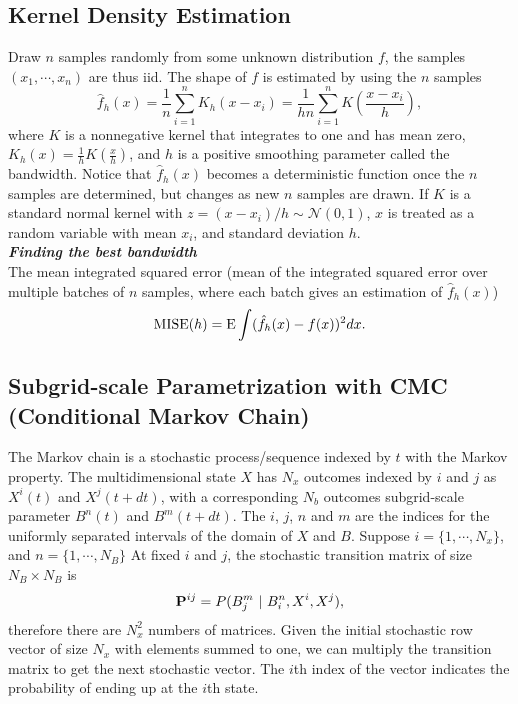\documentclass[12pt]{article}
\newcommand{\Exp}{{\bf\text{E}}}
\begin{document}
\subsection{Kernel Density Estimation}
Draw $n$ samples randomly from some unknown distribution $f$, the samples $(x_1,\cdots,x_n)$ are thus iid. 
The shape of $f$ is estimated by using the $n$ samples
\begin{equation}
   \hat{f}_h(x) = \frac{1}{n} \sum_{i=1}^n K_h(x-x_i) = \frac{1}{hn} \sum_{i=1}^n K(\frac{x-x_i}{h}),
\end{equation}
where $K$ is a nonnegative kernel that integrates to one and has mean zero, $K_h(x) = \frac{1}{h}K(\frac{x}{h})$, and $h$ is a positive smoothing parameter called the bandwidth.
Notice that $\hat{f}_h(x)$ becomes a deterministic function once the $n$ samples are determined, but changes as new $n$ samples are drawn.
If $K$ is a standard normal kernel with $z = (x-x_i)/h \sim \mathcal{N}(0,1)$, $x$ is treated as a random variable with mean $x_i$, and standard deviation $h$. \\


{\bf\emph{Finding the best bandwidth}} \\
The mean integrated squared error (mean of the integrated squared error over multiple batches of $n$ samples, where each batch gives an estimation of $\hat{f}_h(x)$)
\begin{equation}
   \text{MISE}(h) = \Exp\int(\hat{f}_h(x) - f(x))^2 dx.
\end{equation}




\subsection{Subgrid-scale Parametrization with CMC (Conditional Markov Chain)}
The Markov chain is a stochastic process/sequence indexed by $t$ with the Markov property.
The multidimensional state $X$ has $N_x$ outcomes indexed by $i$ and $j$ as $X^i(t)$ and $X^j(t+dt)$, with a corresponding $N_b$ outcomes subgrid-scale parameter $B^n(t)$ and $B^m(t+dt)$.
The $i$, $j$, $n$ and $m$ are the indices for the uniformly separated intervals of the domain of $X$ and $B$.
Suppose $i = \{ 1, \cdots, N_x \}$, and $n = \{ 1, \cdots, N_B \}$
At fixed $i$ and $j$, the stochastic transition matrix of size $N_B \times N_B$ is 
\begin{equation}
  {\bf P}^{ij} = P(B_j^m \ | \ B_i^n, X^i, X^j ),
\end{equation}
therefore there are $N_x^2$ numbers of matrices.
Given the initial stochastic row vector of size $N_x$ with elements summed to one, we can multiply the transition matrix to get the next stochastic vector.
The $i$th index of the vector indicates the probability of ending up at the $i$th state. \\
\end{document}
